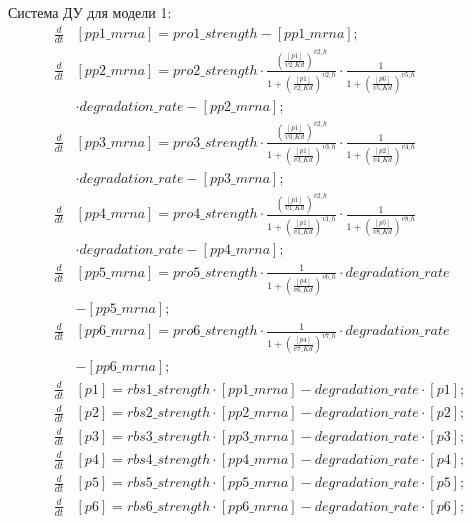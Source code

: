 Система ДУ для модели 1:
\[ \begin{aligned}
  \frac{d}{dt}&[pp1\_mrna] = pro1\_strength - [pp1\_mrna]; \\
  \frac{d}{dt}&[pp2\_mrna] = pro2\_strength
    \cdot \frac{(\frac{[p1]}{v2\_Kd})^{v2\_h}}{1+(\frac{[p1]}{v2\_Kd})^{v2\_h}}
    \cdot \frac{1}{1+(\frac{[p6]}{v5\_Kd})^{v5\_h}} \\
    & \cdot degradation\_rate - [pp2\_mrna]; \\
  \frac{d}{dt}&[pp3\_mrna] = pro3\_strength 
    \cdot \frac{(\frac{[p1]}{v3\_Kd})^{v2\_h}}{1+(\frac{[p1]}{v3\_Kd})^{v3\_h}} 
    \cdot \frac{1}{1+(\frac{[p2]}{v4\_Kd})^{v4\_h}} \\
    & \cdot degradation\_rate - [pp3\_mrna]; \\
  \frac{d}{dt}&[pp4\_mrna] = pro4\_strength 
    \cdot \frac{(\frac{[p1]}{v1\_Kd})^{v2\_h}}{1+(\frac{[p1]}{v1\_Kd})^{v1\_h}} 
    \cdot \frac{1}{1+(\frac{[p5]}{v8\_Kd})^{v8\_h}} \\
    & \cdot degradation\_rate - [pp4\_mrna]; \\
  \frac{d}{dt}&[pp5\_mrna] = pro5\_strength
    \cdot \frac{1}{1+(\frac{[p4]}{v6\_Kd})^{v6\_h}} \cdot degradation\_rate \\
    & - [pp5\_mrna]; \\
  \frac{d}{dt}&[pp6\_mrna] = pro6\_strength
    \cdot \frac{1}{1+(\frac{[p4]}{v7\_Kd})^{v7\_h}} \cdot degradation\_rate \\
    & - [pp6\_mrna]; \\
  \frac{d}{dt}&[p1] = rbs1\_strength \cdot [pp1\_mrna] - degradation\_rate \cdot [p1]; \\
  \frac{d}{dt}&[p2] = rbs2\_strength \cdot [pp2\_mrna] - degradation\_rate \cdot [p2]; \\
  \frac{d}{dt}&[p3] = rbs3\_strength \cdot [pp3\_mrna] - degradation\_rate \cdot [p3]; \\
  \frac{d}{dt}&[p4] = rbs4\_strength \cdot [pp4\_mrna] - degradation\_rate \cdot [p4]; \\
  \frac{d}{dt}&[p5] = rbs5\_strength \cdot [pp5\_mrna] - degradation\_rate \cdot [p5]; \\
  \frac{d}{dt}&[p6] = rbs6\_strength \cdot [pp6\_mrna] - degradation\_rate \cdot [p6];
\end{aligned} \]

